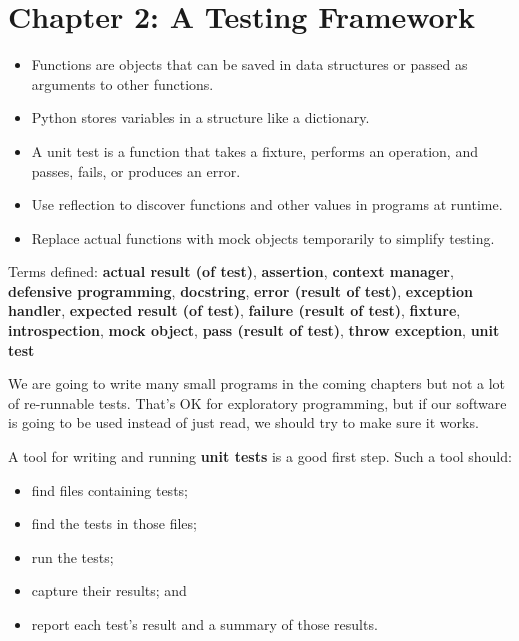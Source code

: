 \documentclass{scrbook}
\newcommand{\glossref}[1]{\textbf{#1}}
\begin{document}
\chapter{Chapter 2: A Testing Framework}\label{tester}

\begin{itemize}

\item Functions are objects that can be saved in data structures or passed as arguments to other functions.

\item Python stores variables in a structure like a dictionary.

\item A unit test is a function that takes a fixture, performs an operation, and passes, fails, or produces an error.

\item Use reflection to discover functions and other values in programs at runtime.

\item Replace actual functions with mock objects temporarily to simplify testing.

\end{itemize}


\noindent 
    Terms defined:
    \glossref{actual result (of test)}, \glossref{assertion}, \glossref{context manager}, \glossref{defensive programming}, \glossref{docstring}, \glossref{error (result of test)}, \glossref{exception handler}, \glossref{expected result (of test)}, \glossref{failure (result of test)}, \glossref{fixture}, \glossref{introspection}, \glossref{mock object}, \glossref{pass (result of test)}, \glossref{throw exception}, \glossref{unit test}



We are going to write many small programs in the coming chapters
but not a lot of re-runnable tests.
That's OK for exploratory programming,
but if our software is going to be used instead of just read,
we should try to make sure it works.


A tool for writing and running \glossref{unit tests} is a good first step.
Such a tool should:

\begin{itemize}

\item find files containing tests;

\item find the tests in those files;

\item run the tests;

\item capture their results; and

\item report each test's result and a summary of those results.

\end{itemize}
\end{document}
